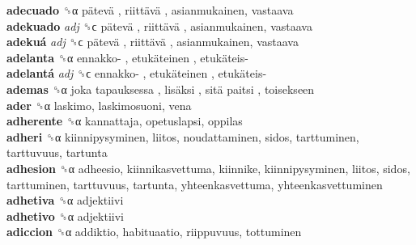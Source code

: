 \textbf{adecuado} ␝α   pätevä ,  riittävä , asianmukainen, vastaava  \\
\textbf{adekuado} \emph{adj}  ␝ϲ   pätevä ,  riittävä , asianmukainen, vastaava  \\
\textbf{adekuá} \emph{adj}  ␝ϲ   pätevä ,  riittävä , asianmukainen, vastaava  \\
\textbf{adelanta} ␝α   ennakko- ,  etukäteinen ,  etukäteis-   \\
\textbf{adelantá} \emph{adj}  ␝ϲ   ennakko- ,  etukäteinen ,  etukäteis-   \\
\textbf{ademas} ␝α   joka tapauksessa ,  lisäksi ,  sitä paitsi , toisekseen  \\
\textbf{ader} ␝α  laskimo, laskimosuoni, vena  \\
\textbf{adherente} ␝α  kannattaja, opetuslapsi, oppilas  \\
\textbf{adheri} ␝α  kiinnipysyminen, liitos, noudattaminen, sidos, tarttuminen, tarttuvuus, tartunta  \\
\textbf{adhesion} ␝α  adheesio, kiinnikasvettuma, kiinnike, kiinnipysyminen, liitos, sidos, tarttuminen, tarttuvuus, tartunta, yhteenkasvettuma, yhteenkasvettuminen  \\
\textbf{adhetiva} ␝α  adjektiivi  \\
\textbf{adhetivo} ␝α  adjektiivi  \\
\textbf{adiccion} ␝α  addiktio, habituaatio, riippuvuus, tottuminen  \\
